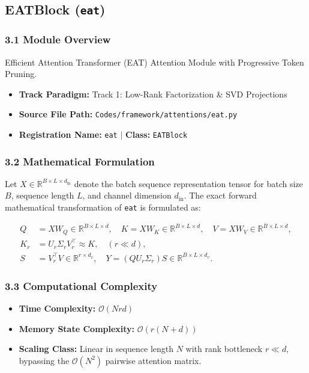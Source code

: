 \subsection{EATBlock (\texttt{eat})}
\label{sec:app_module_eat}

\subsubsection*{3.1 Module Overview}
Efficient Attention Transformer (EAT) Attention Module with Progressive Token Pruning.
\begin{itemize}
    \item \textbf{Track Paradigm:} Track 1: Low-Rank Factorization \& SVD Projections
    \item \textbf{Source File Path:} \texttt{Codes/framework/attentions/eat.py}
    \item \textbf{Registration Name:} \texttt{eat} $\mid$ \textbf{Class:} \texttt{EATBlock}
\end{itemize}

\subsubsection*{3.2 Mathematical Formulation}
Let $X \in \mathbb{R}^{B \times L \times d_{\text{in}}}$ denote the batch sequence representation tensor for batch size $B$, sequence length $L$, and channel dimension $d_{\text{in}}$. The exact forward mathematical transformation of \texttt{eat} is formulated as:

\begin{align}
Q &= X W_Q \in \mathbb{R}^{B \times L \times d}, \quad K = X W_K \in \mathbb{R}^{B \times L \times d}, \quad V = X W_V \in \mathbb{R}^{B \times L \times d}, \\
K_r &= U_r \Sigma_r V_r^\top \approx K, \quad (r \ll d), \\
S &= V_r^\top V \in \mathbb{R}^{r \times d_v}, \quad Y = (Q U_r \Sigma_r) S \in \mathbb{R}^{B \times L \times d_v}.
\end{align}


\subsubsection*{3.3 Computational Complexity}
\begin{itemize}
    \item \textbf{Time Complexity:} $\mathcal{O}(N r d)$
    \item \textbf{Memory State Complexity:} $\mathcal{O}(r(N + d))$
    \item \textbf{Scaling Class:} Linear in sequence length $N$ with rank bottleneck $r \ll d$, bypassing the $\mathcal{O}(N^2)$ pairwise attention matrix.
\end{itemize}

